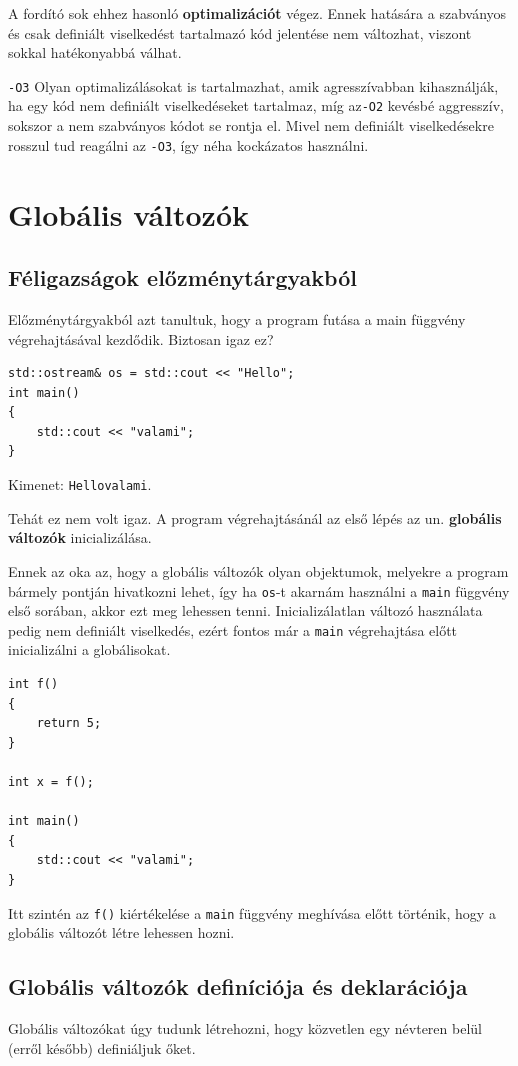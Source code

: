 \documentclass[a4paper,11.5pt,table]{article}
\begin{document}
	A fordító sok ehhez hasonló \textbf{optimalizációt} végez. Ennek hatására a szabványos és csak definiált viselkedést tartalmazó kód jelentése nem változhat, viszont sokkal hatékonyabbá válhat.
	\begin{note}
		\texttt{-O3} Olyan optimalizálásokat is tartalmazhat, amik agresszívabban kihasználják, ha egy kód nem definiált viselkedéseket tartalmaz, míg az\texttt{-O2} kevésbé aggresszív, sokszor a nem szabványos kódot se rontja el. Mivel nem definiált viselkedésekre rosszul tud reagálni az \texttt{-O3}, így néha kockázatos használni.
	\end{note}

	\section{Globális változók}
	\subsection{Féligazságok előzménytárgyakból}
	Előzménytárgyakból azt tanultuk, hogy a program futása a main függvény végrehajtásával kezdődik. Biztosan igaz ez?
	\begin{lstlisting}
std::ostream& os = std::cout << "Hello";
int main()
{
	std::cout << "valami";
}
	\end{lstlisting}
	Kimenet: \texttt{Hellovalami}.
	\medskip
	
	Tehát ez nem volt igaz. A program végrehajtásánál az első lépés az un. \textbf{globális változók} inicializálása. 
	
	Ennek az oka az, hogy a globális változók olyan objektumok, melyekre a program bármely pontján hivatkozni lehet, így ha \texttt{os}-t akarnám használni a \texttt{main} függvény első sorában, akkor ezt meg lehessen tenni. Inicializálatlan változó használata pedig nem definiált viselkedés, ezért fontos már a \texttt{main} végrehajtása előtt inicializálni a globálisokat.
	\begin{lstlisting}
int f()
{
	return 5;
}

int x = f();

int main()
{
	std::cout << "valami";
}
	\end{lstlisting}
	Itt szintén az \texttt{f()} kiértékelése a \texttt{main} függvény meghívása előtt történik, hogy a globális változót létre lehessen hozni.
	\subsection{Globális változók definíciója és deklarációja}
	Globális változókat úgy tudunk létrehozni, hogy közvetlen egy névteren belül (erről később) definiáljuk őket.
	\medskip
	
\end{document}
